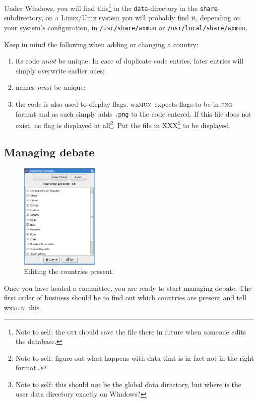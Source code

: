 \documentclass[11pt, a4paper]{article}
\newcommand\wxMUN{wx\textsc{mun}}
\begin{document}
Under Windows, you will find this\footnote{Note to self: the \textsc{gui} should save the file there in future when someone edits the database.} in the \texttt{data}-directory in the \texttt{share}-subdirectory, on a Linux/Unix system you will probably find it, depending on your system's configuration, in \texttt{/usr/share/wxmun} or \texttt{/usr/local/share/wxmun}.

Keep in mind the following when adding or changing a country:
\begin{enumerate}
\item its code \emph{must} be unique. In case of duplicate code entries, later entries will simply overwrite earlier ones;
\item names \emph{must} be unique;
\item the code is also used to display flags. \wxMUN\ expects flags to be in \textsc{png}-format and as such simply adds \texttt{.png} to the code 
entered. If this file does not exist, no flag is displayed at all\footnote{Note to self: figure out what happens with data that is in fact not in the right format\ldots}. Put the file in XXX\footnote{Note to self: this should not be the global data directory, but where is the user data directory exactly on Windows?} to be displayed.
\end{enumerate}

\subsection{Managing debate}
\begin{figure}
\includegraphics[width=0.34\textwidth]{screenshots/countries_present.png}
\caption{Editing the countries present.}
\end{figure}

Once you have loaded a committee, you are ready to start managing debate. The first order of business should be to find out which countries are present and tell \wxMUN\ this.
\end{document}
